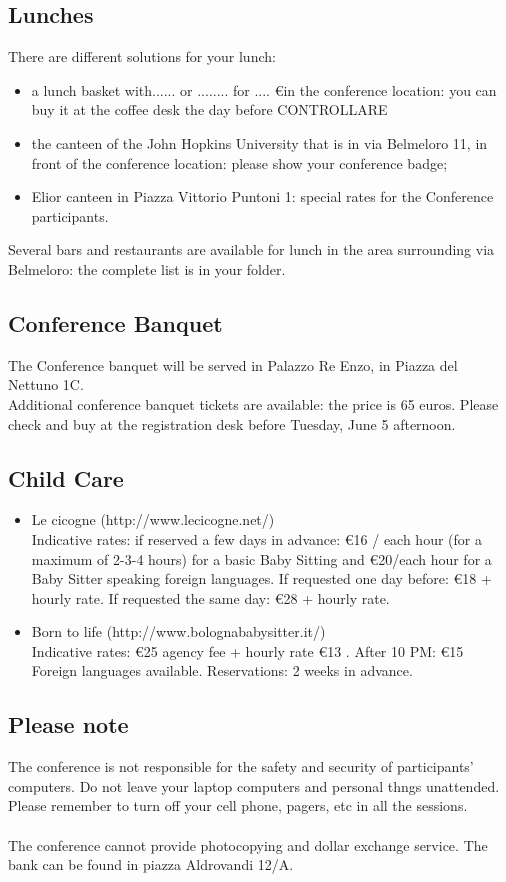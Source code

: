 \begin{multicols}{2}
\subsection*{Lunches}
There are different solutions for your lunch: 
\begin{itemize}
\item a lunch basket with...... or ........ for .... \euro in the conference location: you can buy it at the coffee desk the day before CONTROLLARE
\item the canteen of the John Hopkins University that is in via Belmeloro 11, in front of the conference location: please show your conference badge;
\item Elior canteen in Piazza Vittorio Puntoni 1: special rates for the Conference participants.
\end{itemize}
Several bars and restaurants are available for lunch in the area surrounding via Belmeloro: the complete list is in your folder.

\subsection*{Conference Banquet}
The Conference banquet will be served in Palazzo Re Enzo, in Piazza del Nettuno 1C.\\ Additional conference banquet tickets are available: the price is 65 euros. Please check and buy at the registration desk before Tuesday, June 5 afternoon.
\subsection*{Child Care}
\begin{itemize}
\item Le cicogne (http://www.lecicogne.net/)\\
Indicative rates: if reserved a few days in advance: \euro 16 / each hour (for a maximum of 2-3-4 hours) for a basic Baby Sitting and \euro 20/each hour for a Baby Sitter speaking foreign languages.
If requested one day before: \euro 18 + hourly rate.
If requested the same day: \euro 28 + hourly rate.
\item Born to life (http://www.bolognababysitter.it/)\\
Indicative rates: \euro 25 agency fee + hourly rate \euro 13 . After 10 PM: \euro 15 Foreign languages available. Reservations: 2 weeks in advance.
\end{itemize}
\subsection*{Please note}
The conference is not responsible for the safety and security of participants' computers. Do not leave your laptop computers and personal thngs unattended. Please remember to turn off your cell phone, pagers, etc in all the sessions.\\\\ The conference cannot provide photocopying and dollar exchange service. The bank can be found in piazza Aldrovandi 12/A.

\end{multicols}
